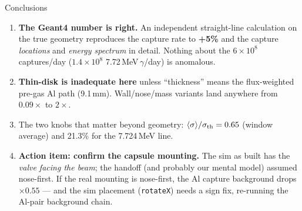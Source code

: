 \documentclass[aspectratio=169,11pt]{beamer}
\newcommand{\good}[1]{\textcolor{caqua}{#1}}
\newcommand{\bad}[1]{\textcolor{corange}{#1}}
\begin{document}
\begin{frame}{Conclusions}
  \begin{enumerate}
    \item \good{\textbf{The Geant4 number is right.}} An independent
          straight-line calculation on the true geometry reproduces the
          capture rate to \textbf{+5\%} and the capture \emph{locations}
          and \emph{energy spectrum} in detail. Nothing about the
          $6\times10^{8}$ captures/day ($1.4\times10^{8}$
          7.72\,MeV\,$\gamma$/day) is anomalous.
    \item \textbf{Thin-disk is inadequate here} unless ``thickness'' means
          the flux-weighted pre-gas Al path (9.1\,mm). Wall/nose/mass
          variants land anywhere from $0.09\times$ to $2\times$.
    \item The two knobs that matter beyond geometry:
          $\langle\sigma\rangle/\sigma_{\rm th}=0.65$ (window average) and
          21.3\% for the 7.724\,MeV line.
    \item \bad{\textbf{Action item: confirm the capsule mounting.}}
          The sim as built has the \emph{valve facing the beam}; the handoff
          (and probably our mental model) assumed nose-first. If the real
          mounting is nose-first, the Al capture background drops
          $\times0.55$ --- and the sim placement (\texttt{rotateX}) needs a
          sign fix, re-running the Al-pair background chain.
  \end{enumerate}
\end{frame}
\end{document}
